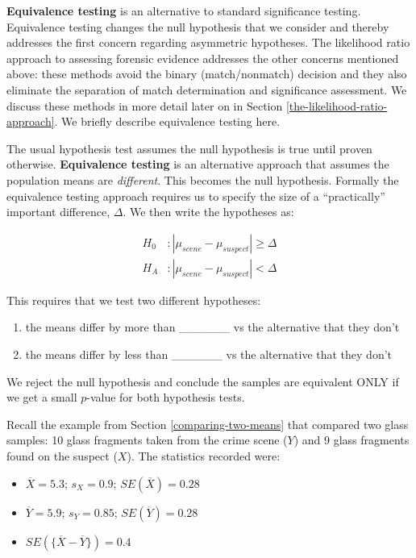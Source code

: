 \documentclass[]{book}
\providecommand{\tightlist}{%
  \setlength{\itemsep}{0pt}\setlength{\parskip}{0pt}}
\theoremstyle{definition}
\theoremstyle{definition}
\theoremstyle{remark}
\begin{document}
\textbf{Equivalence testing} is an alternative to standard significance
testing. Equivalence testing changes the null hypothesis that we
consider and thereby addresses the first concern regarding asymmetric
hypotheses. The likelihood ratio approach to assessing forensic evidence
addresses the other concerns mentioned above: these methods avoid the
binary (match/nonmatch) decision and they also eliminate the separation
of match determination and significance assessment. We discuss these
methods in more detail later on in Section
\ref{the-likelihood-ratio-approach}. We briefly describe equivalence
testing here.

The usual hypothesis test assumes the null hypothesis is true until
proven otherwise. \textbf{Equivalence testing} is an alternative
approach that assumes the population means are \emph{different}. This
becomes the null hypothesis. Formally the equivalence testing approach
requires us to specify the size of a ``practically'' important
difference, \(\Delta\). We then write the hypotheses as:

\begin{equation}\label{eq:et}
\begin{split}
H_0 & :  |\mu_{scene} - \mu_{suspect} | \geq \Delta  \\
H_A & :  |\mu_{scene} - \mu_{suspect} | < \Delta  
\end{split}
\end{equation}

This requires that we test two different hypotheses:

\begin{enumerate}
\def\labelenumi{\arabic{enumi}.}
\tightlist
\item
  the means differ by more than \_\_\_\_\_\_ vs the alternative that
  they don't \vspace{.1in}
\item
  the means differ by less than \_\_\_\_\_\_ vs the alternative that
  they don't
\end{enumerate}

We reject the null hypothesis and conclude the samples are equivalent
ONLY if we get a small \(p\)-value for both hypothesis tests.

Recall the example from Section \ref{comparing-two-means} that compared
two glass samples: 10 glass fragments taken from the crime scene (\(Y\))
and 9 glass fragments found on the suspect (\(X\)). The statistics
recorded were:

\begin{itemize}
\tightlist
\item
  \(\overline{X} = 5.3\); \(s_X = 0.9\); \(SE(\overline{X}) = 0.28\)
  \vspace{.1in}
\item
  \(\overline{Y} = 5.9\); \(s_Y = 0.85\); \(SE(\overline{Y}) = 0.28\)
  \vspace{.1in}
\item
  \(SE(\{\overline{X} - \overline{Y}\}) = 0.4\)
\end{itemize}
\end{document}
